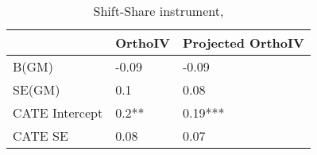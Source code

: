 \begin{table}\centering\caption{Shift-Share instrument, }\begin{tabular}{lll}
\toprule
                & OrthoIV   & Projected OrthoIV   \\
\midrule
 B(GM)          & -0.09     & -0.09               \\
 SE(GM)         & 0.1       & 0.08                \\
 CATE Intercept & 0.2**     & 0.19***             \\
 CATE SE        & 0.08      & 0.07                \\
\bottomrule
\end{tabular}\end{table}